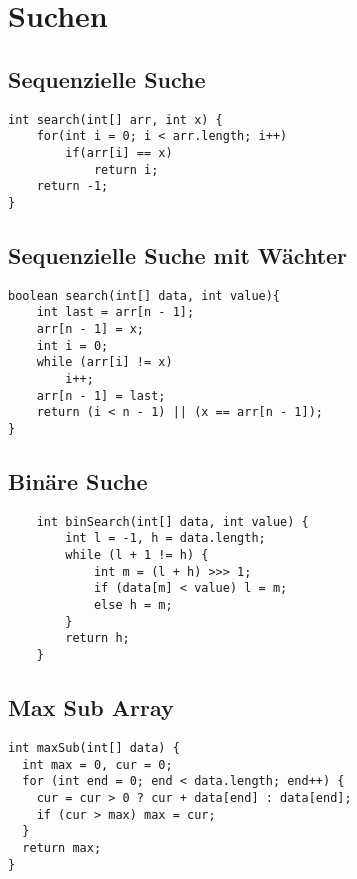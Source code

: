\section*{Suchen}
\subsection*{Sequenzielle Suche}
\begin{verbatim}
int search(int[] arr, int x) {
    for(int i = 0; i < arr.length; i++) 
        if(arr[i] == x) 
            return i; 
    return -1; 
}
\end{verbatim}

\subsection*{Sequenzielle Suche mit Wächter}
\begin{verbatim}
boolean search(int[] data, int value){
    int last = arr[n - 1];  
    arr[n - 1] = x;  
    int i = 0;  
    while (arr[i] != x)  
        i++;  
    arr[n - 1] = last;
    return (i < n - 1) || (x == arr[n - 1]);
}
\end{verbatim}

\subsection*{Binäre Suche}
\begin{verbatim}
    int binSearch(int[] data, int value) {
        int l = -1, h = data.length;
        while (l + 1 != h) {
            int m = (l + h) >>> 1;
            if (data[m] < value) l = m;
            else h = m;
        }
        return h;
    }
\end{verbatim}
\subsection*{Max Sub Array}
\begin{verbatim}
int maxSub(int[] data) {
  int max = 0, cur = 0;
  for (int end = 0; end < data.length; end++) {
    cur = cur > 0 ? cur + data[end] : data[end];
	if (cur > max) max = cur;
  }
  return max;
}
\end{verbatim}

